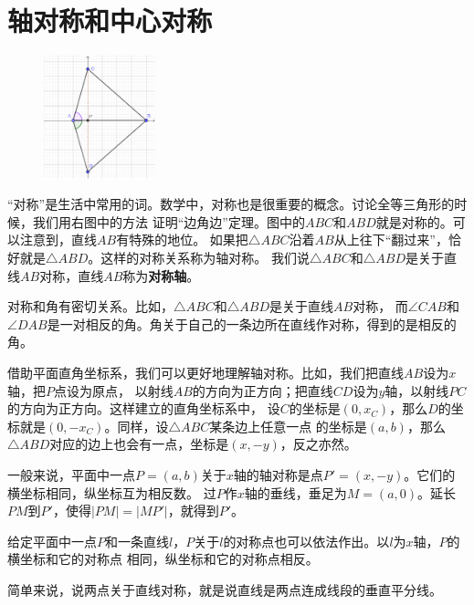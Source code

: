 \documentclass[12pt,UTF8]{ctexbook}
\begin{document}
\section{轴对称和中心对称}
\begin{figure} %
    \vspace{-30pt}
    \centering
    \includegraphics[width=0.288\textwidth]{tu/坐标系3.png}
\end{figure}

“对称”是生活中常用的词。数学中，对称也是很重要的概念。讨论全等三角形的时候，我们用右图中的方法
证明“边角边”定理。图中的$ABC$和$ABD$就是对称的。可以注意到，直线$AB$有特殊的地位。
如果把$\triangle ABC$沿着$AB$从上往下“翻过来”，恰好就是$\triangle ABD$。这样的对称关系称为轴对称。
我们说$\triangle ABC$和$\triangle ABD$是关于直线$AB$对称，直线$AB$称为\textbf{对称轴}。

对称和角有密切关系。比如，$\triangle ABC$和$\triangle ABD$是关于直线$AB$对称，
而$\angle CAB$和$\angle DAB$是一对相反的角。角关于自己的一条边所在直线作对称，得到的是相反的角。

借助平面直角坐标系，我们可以更好地理解轴对称。比如，我们把直线$AB$设为$x$轴，把$P$点设为原点，
以射线$AB$的方向为正方向；把直线$CD$设为$y$轴，以射线$PC$的方向为正方向。这样建立的直角坐标系中，
设$C$的坐标是$(0, x_C)$，那么$D$的坐标就是$(0, -x_C)$。同样，设$\triangle ABC$某条边上任意一点
的坐标是$(a, b)$，那么$\triangle ABD$对应的边上也会有一点，坐标是$(x, -y)$，反之亦然。

一般来说，平面中一点$P = (a, b)$关于$x$轴的轴对称是点$P' = (x, -y)$。它们的横坐标相同，纵坐标互为相反数。
过$P$作$x$轴的垂线，垂足为$M = (a,0)$。延长$PM$到$P'$，使得$|PM| = |MP'|$，就得到$P'$。

给定平面中一点$P$和一条直线$l$，$P$关于$l$的对称点也可以依法作出。以$l$为$x$轴，$P$的横坐标和它的对称点
相同，纵坐标和它的对称点相反。

简单来说，说两点关于直线对称，就是说直线是两点连成线段的垂直平分线。
\end{document}

